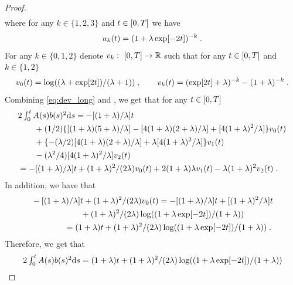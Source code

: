 \begin{proof}
\begin{align}
    \end{align}
    where for any $k \in \{1,2, 3\}$ and $t \in \left[0,T\right]$ we have
    \begin{equation}
      u_k(t) = (1 + \lambda \exp[-2t])^{-k} \; . 
    \end{equation}
    For any $k \in \{0, 1, 2\}$ denote $v_k : \ \left[0,T\right] \to \mathbb{R}$ such that
    for any $t \in \left[0,T\right]$ and $k \in \{1, 2\}$
    \begin{equation}
      v_0(t) = \log((\lambda + \exp[2t])/(\lambda+1)) \; , \qquad v_k(t) = (\exp[2t] + \lambda)^{-k} - (1 + \lambda)^{-k}\; .
    \end{equation}
    Combining \eqref{eq:dev_long} and , we get
    that for any $t \in \left[0,T\right]$
    \begin{align}
      &\textstyle{2 \int_0^t A(s) b(s)^2 \mathrm{d}s} = -[(1+\lambda)/\lambda]t \\
                                              & \qquad + (1/2) \{ [(1+\lambda)(5 + \lambda)/\lambda] - [4(1+\lambda)(2+\lambda)/\lambda] + [4(1+\lambda)^2/\lambda] \} v_0(t) \\
                                              & \qquad + \{ - (\lambda/2) [4(1+\lambda)(2+\lambda)/\lambda] + \lambda [4(1+\lambda)^2/\lambda]\} v_1(t) \\
                                              & \qquad  - (\lambda^2/4)  [4(1+\lambda)^2/\lambda] v_2(t) \\
      &= -[(1+\lambda)/\lambda]t + (1+\lambda)^2/(2\lambda) v_0(t) + 2(1+\lambda)\lambda v_1(t) - \lambda(1+\lambda)^2 v_2(t) \; . 
    \end{align}
    In addition, we have that
    \begin{align}
      &-[(1+\lambda)/\lambda]t + (1+\lambda)^2/(2\lambda) v_0(t) = -[(1+\lambda)/\lambda]t + [(1+\lambda)^2/\lambda]t \\ 
                                                                & \qquad \qquad \qquad + (1+\lambda)^2/(2\lambda)\log((1 + \lambda \exp[-2t])/(1 + \lambda)) \\
      &\qquad \qquad =(1+\lambda)t +(1+\lambda)^2/(2\lambda)\log((1 + \lambda \exp[-2t])/(1 + \lambda)) \; . 
    \end{align}
    Therefore, we get that
    \begin{align}
      \textstyle{2 \int_0^t A(s) b(s)^2 \rmd s} & = (1+\lambda)t +(1+\lambda)^2/(2\lambda)\log((1 + \lambda \exp[-2t])/(1 + \lambda))  \\

\end{align}
\end{proof}
